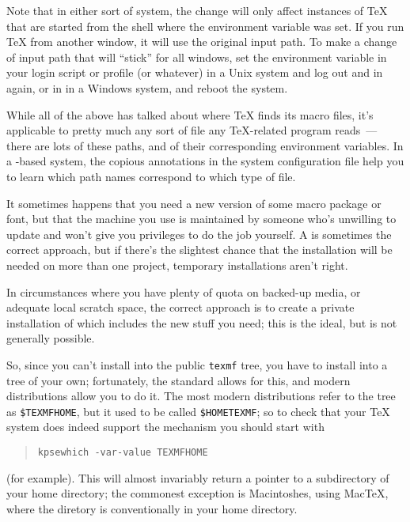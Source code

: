 Note that in either sort of system, the change will only affect
instances of \TeX{} that are started from the shell where the
environment variable was set.  If you run \TeX{} from another window,
it will use the original input path.  To make a change of input path
that will ``stick'' for all windows, set the environment variable in
your login script or profile (or whatever) in a Unix system and log
out and in again, or in  in a Windows system, and
reboot the system.

While all of the above has talked about where \TeX{} finds its macro
files, it's applicable to pretty much any sort of file any
\TeX{}-related program reads~--- there are lots of these paths, and of
their corresponding environment variables.  In a
-based system, the copious annotations in the
 system configuration file help you to learn which
path names correspond to which type of file.


It sometimes happens that you need a new version of some macro package
or font, but that the machine you use is maintained by someone who's
unwilling to update and won't give you privileges to do the job
yourself.  A  is
sometimes the correct approach, but if there's the slightest chance
that the installation will be needed on more than one project,
temporary installations aren't right.

In circumstances where you have plenty of quota on backed-up media, or
adequate local scratch space, the correct approach is to create a
private installation of \AllTeX{} which includes the new stuff you
need; this is the ideal, but is not generally possible.

So, since you can't install into the public \texttt{texmf} tree, you
have to install into a  tree of your own; fortunately, the
 standard allows for this, and modern distributions allow
you to do it.  The most modern distributions refer to the tree as
\texttt{\$TEXMFHOME}, but it used to be called \texttt{\$HOMETEXMF};
so to check that your \TeX{} system does indeed support the mechanism
you should start with
\begin{quote}
\begin{verbatim}
kpsewhich -var-value TEXMFHOME
\end{verbatim}
\end{quote}
(for example).  This will almost invariably return a pointer to a
subdirectory  of your home directory; the commonest
exception is Macintoshes, using Mac\TeX{}, where the diretory is
conventionally  in your home directory.

